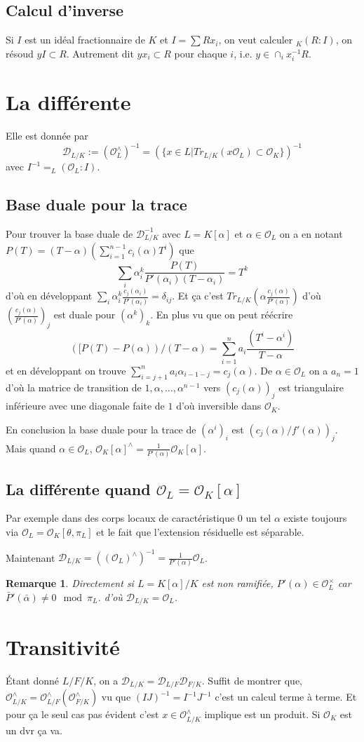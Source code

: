 \documentclass[a4paper,12pt]{book}
\newcommand{\Or}{\mathcal{O}}
\newcommand{\D}{\mathscr{D}}
\theoremstyle{plain}
\newtheorem{rem}{Remarque}
\theoremstyle{definition}
\theoremstyle{remark}
\begin{document}
\subsection{Calcul d'inverse}
Si $I$ est un idéal fractionnaire de $K$ et $I=\sum Rx_i$, on veut calculer
$_K(R:I)$, on résoud $yI\subset R$. Autrement dit $yx_i\subset R$ pour
chaque $i$, i.e. $y\in \cap_i x_i^{-1}R$.

\section{La différente}
Elle est donnée par 
\[\D_{L/K}:=(\Or_L^\wedge)^{-1}=(\{x\in L| Tr_{L/K}(x\Or_L)\subset \Or_K\})^{-1}\]
avec $I^{-1}=_L(\Or_L:I)$.

\subsection{Base duale pour la trace}
Pour trouver la base duale de $\D_{L/K}^{-1}$
avec $L=K[\alpha]$ et $\alpha\in \Or_L$ on a en notant 
$P(T)=(T-\alpha)(\sum_{i=1}^{n-1} c_i(\alpha)T^i)$ que 
\[\sum_i \alpha_i^k\frac{P(T)}{P'(\alpha_i)(T-\alpha_i)}=T^k\]
d'où en développant 
$\sum_i \alpha_i^k\frac{c_j(\alpha_i)}{P'(\alpha_i)}=\delta_{ij}$.
Et ça c'est $Tr_{L/K}(\alpha\frac{c_j(\alpha)}{P'(\alpha)})$ d'où
$(\frac{c_j(\alpha)}{P'(\alpha)})_j$ est duale pour $(\alpha^k)_k$.
En plus vu que on peut réécrire 
\[([P(T)-P(\alpha))/(T-\alpha)=\sum_{i=1}^n a_i\frac{(T^i-\alpha^i)}{T-\alpha}\]
et en développant on trouve $\sum_{i=j+1}^n a_i\alpha_{i-1-j}=c_j(\alpha)$.
De $\alpha\in\Or_L$ on a $a_n=1$ d'où la matrice de transition de 
$1,\alpha,\ldots,\alpha^{n-1}$ vers $(c_j(\alpha))_j$ est triangulaire
inférieure avec une diagonale faite de $1$ d'où inversible dans 
$\Or_K$.

En conclusion la base duale
pour la trace de $(\alpha^i)_i$ est $(c_j(\alpha)/f'(\alpha))_j$.
Mais quand $\alpha\in\Or_L$, 
$\Or_K[\alpha]^\wedge=\frac{1}{P'(\alpha)}\Or_K[\alpha]$.
\subsection{La différente quand $\Or_L=\Or_K[\alpha]$}
Par exemple dans des corps locaux de caractéristique $0$ un tel
$\alpha$ existe toujours via $\Or_L=\Or_K[\theta,\pi_L]$ et
le fait que l'extension résiduelle est séparable.

Maintenant $\D_{L/K}=((\Or_L)^\wedge)^{-1}=\frac{1}{P'(\alpha)}\Or_L$.

\begin{rem}
    Directement si $L=K[\alpha]/K$ est non ramifiée, $P'(\alpha)\in \Or_L^\times$
    car $\bar P'(\bar \alpha)\ne 0\mod \pi_L$.
    d'où $\D_{L/K}=\Or_L$.
\end{rem}

\section{Transitivité}
Étant donné $L/F/K$, on a $\D_{L/K}=\D_{L/F}\D_{F/K}$. Suffit de montrer
que, $\Or_{L/K}^\wedge=\Or_{L/F}^\wedge(\Or_{F/K}^\wedge)$ vu que 
$(IJ)^{-1}=I^{-1}J^{-1}$ c'est un calcul terme à terme. Et pour ça 
le seul cas pas évident c'est $x\in \Or_{L/K}^\wedge$ implique est
un produit. Si $\Or_K$ est un dvr ça va. 
\end{document}
